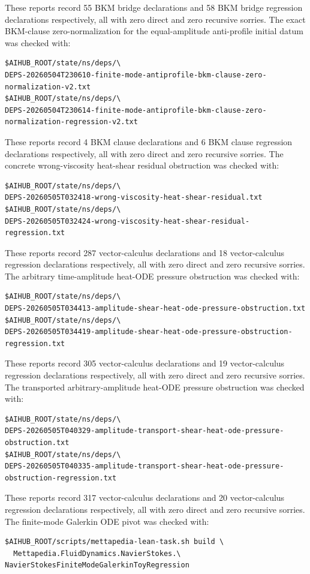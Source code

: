 \documentclass[11pt]{article}
\begin{document}
These reports record 55 BKM bridge declarations and 58 BKM bridge regression
declarations respectively, all with zero direct and zero recursive sorries.
The exact BKM-clause zero-normalization for the equal-amplitude anti-profile
initial datum was checked with:
\begin{verbatim}
$AIHUB_ROOT/state/ns/deps/\
DEPS-20260504T230610-finite-mode-antiprofile-bkm-clause-zero-normalization-v2.txt
$AIHUB_ROOT/state/ns/deps/\
DEPS-20260504T230614-finite-mode-antiprofile-bkm-clause-zero-normalization-regression-v2.txt
\end{verbatim}
These reports record 4 BKM clause declarations and 6 BKM clause regression
declarations respectively, all with zero direct and zero recursive sorries.
The concrete wrong-viscosity heat-shear residual obstruction was checked with:
\begin{verbatim}
$AIHUB_ROOT/state/ns/deps/\
DEPS-20260505T032418-wrong-viscosity-heat-shear-residual.txt
$AIHUB_ROOT/state/ns/deps/\
DEPS-20260505T032424-wrong-viscosity-heat-shear-residual-regression.txt
\end{verbatim}
These reports record 287 vector-calculus declarations and 18 vector-calculus
regression declarations respectively, all with zero direct and zero recursive
sorries.
The arbitrary time-amplitude heat-ODE pressure obstruction was checked with:
\begin{verbatim}
$AIHUB_ROOT/state/ns/deps/\
DEPS-20260505T034413-amplitude-shear-heat-ode-pressure-obstruction.txt
$AIHUB_ROOT/state/ns/deps/\
DEPS-20260505T034419-amplitude-shear-heat-ode-pressure-obstruction-regression.txt
\end{verbatim}
These reports record 305 vector-calculus declarations and 19 vector-calculus
regression declarations respectively, all with zero direct and zero recursive
sorries.
The transported arbitrary-amplitude heat-ODE pressure obstruction was checked
with:
\begin{verbatim}
$AIHUB_ROOT/state/ns/deps/\
DEPS-20260505T040329-amplitude-transport-shear-heat-ode-pressure-obstruction.txt
$AIHUB_ROOT/state/ns/deps/\
DEPS-20260505T040335-amplitude-transport-shear-heat-ode-pressure-obstruction-regression.txt
\end{verbatim}
These reports record 317 vector-calculus declarations and 20 vector-calculus
regression declarations respectively, all with zero direct and zero recursive
sorries.
The finite-mode Galerkin ODE pivot was checked with:
\begin{verbatim}
$AIHUB_ROOT/scripts/mettapedia-lean-task.sh build \
  Mettapedia.FluidDynamics.NavierStokes.\
NavierStokesFiniteModeGalerkinToyRegression
\end{verbatim}
\end{document}
